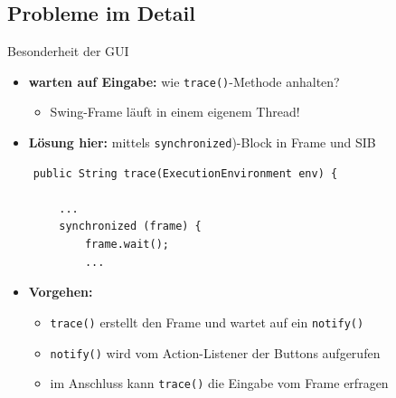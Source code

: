 \subsection*{Probleme im Detail}
\begin{frame}[fragile]{Besonderheit der GUI}
\begin{itemize}[<+->]
	\item \textbf{warten auf Eingabe:} wie \texttt{trace()}-Methode anhalten?
		\begin{itemize}[<+->]
			\item Swing-Frame läuft in einem eigenem Thread!
		\end{itemize}
	\pause
	\item \textbf{Lösung hier:} mittels \texttt{synchronized})-Block in Frame und SIB
\end{itemize}

	\begin{lstlisting}
	public String trace(ExecutionEnvironment env) {

		...
		synchronized (frame) {
			frame.wait();
			...
	\end{lstlisting}

\begin{itemize}[<+->]
	\item \textbf{Vorgehen:}
		\begin{itemize}[<+->]
			\item \texttt{trace()} erstellt den Frame und wartet auf ein \texttt{notify()}
			\item \texttt{notify()} wird vom Action-Listener der Buttons aufgerufen
			\item im Anschluss kann \texttt{trace()} die Eingabe vom Frame erfragen
		\end{itemize}
\end{itemize}
\end{frame}


